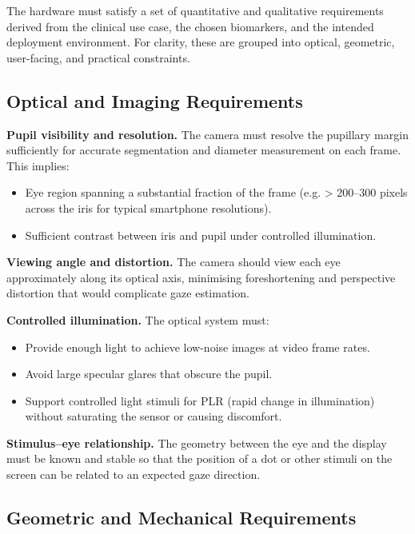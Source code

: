 The hardware must satisfy a set of quantitative and qualitative requirements derived from the clinical use case, the chosen biomarkers, and the intended deployment environment. For clarity, these are grouped into optical, geometric, user-facing, and practical constraints.

\subsection{Optical and Imaging Requirements}

\textbf{Pupil visibility and resolution.} The camera must resolve the pupillary margin sufficiently for accurate segmentation and diameter measurement on each frame. This implies:

\begin{itemize}
    \item Eye region spanning a substantial fraction of the frame (e.g. > 200--300 pixels across the iris for typical smartphone resolutions).

    \item Sufficient contrast between iris and pupil under controlled illumination.
\end{itemize}

\textbf{Viewing angle and distortion.} The camera should view each eye approximately along its optical axis, minimising foreshortening and perspective distortion that would complicate gaze estimation.

\textbf{Controlled illumination.} The optical system must:

\begin{itemize}
    \item Provide enough light to achieve low-noise images at video frame rates.

    \item Avoid large specular glares that obscure the pupil.

    \item Support controlled light stimuli for PLR (rapid change in illumination) without saturating the sensor or causing discomfort.
\end{itemize}

\textbf{Stimulus--eye relationship.} The geometry between the eye and the display must be known and stable so that the position of a dot or other stimuli on the screen can be related to an expected gaze direction.

\subsection{Geometric and Mechanical Requirements}

